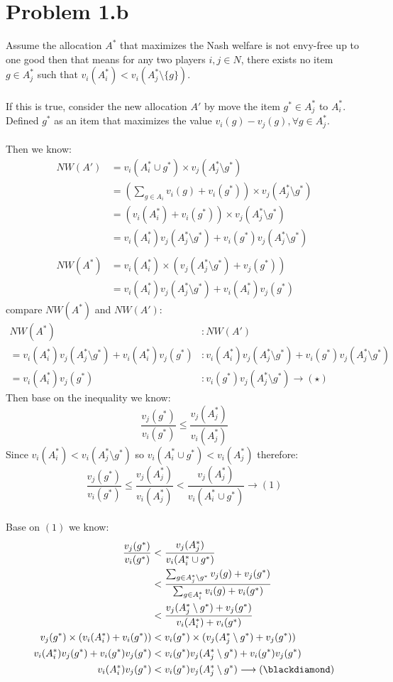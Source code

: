 \documentclass{article}
\begin{document}
\newpage
\section{Problem 1.b}

Assume the allocation $A^*$ that maximizes the Nash welfare is not envy-free up to one good then that means for any two players $i,j \in N$, there exists no item $g \in A^*_j$ such that $v_i(A^*_i) < v_i(A^*_j \setminus \{g\})$.\\\\
If this is true, consider the  new allocation $A'$ by move the item $g^* \in A^*_j$ to $A^*_i$. Defined $g^*$ as an item that maximizes the value $v_i(g) - v_j(g), \forall g \in A^*_j$.\\\\
Then we know:
\begin{align*}
NW(A') &= v_i(A^*_i \cup g^*) \times v_j(A^*_j \setminus g^*)\\
&= \left(\sum_{g \in A_i} v_i(g) + v_i(g^*)\right) \times v_j(A^*_j \setminus g^*)\\
&= (v_i(A^*_i) + v_i(g^*)) \times v_j(A^*_j \setminus g^*)\\
&= v_i(A^*_i)v_j(A^*_j \setminus g^*) + v_i(g^*)v_j(A^*_j \setminus g^*)\\\\
NW(A^*) &= v_i(A^*_i) \times (v_j(A^*_j \setminus g^*) + v_j(g^*))\\
&= v_i(A^*_i)v_j(A^*_j \setminus g^*) + v_i(A^*_i)v_j(g^*)
\end{align*}
compare $NW(A^*)$ and $NW(A')$:
\begin{align*}
NW(A^*) &: NW(A')\\
= v_i(A^*_i)v_j(A^*_j \setminus g^*) + v_i(A^*_i)v_j(g^*) &: v_i(A^*_i)v_j(A^*_j \setminus g^*) + v_i(g^*)v_j(A^*_j \setminus g^*)\\
= v_i(A^*_i)v_j(g^*) &: v_i(g^*)v_j(A^*_j \setminus g^*) \longrightarrow (\star)
\end{align*}
Then base on the inequality we know:
$$\frac{v_j(g^*)}{v_i(g^*)} \leq \frac{v_j(A^*_j)}{v_i(A^*_j)}$$
Since $v_i(A^*_i) < v_i(A^*_j \setminus g^*)$ so $v_i(A^*_i \cup g^*) < v_i(A^*_j)$ therefore:
$$\frac{v_j(g^*)}{v_i(g^*)} \leq \frac{v_j(A^*_j)}{v_i(A^*_j)} < \frac{v_j(A^*_j)}{v_i(A^*_i \cup g^*)} \longrightarrow (1)$$\\
Base on $(1)$ we know:
\begin{align*}
\frac{v_j(g^*)}{v_i(g^*)} &< \frac{v_j(A^*_j)}{v_i(A^*_i \cup g^*)}\\
&< \frac{\sum_{g \in A^*_j\setminus g^*}v_j(g) + v_j(g^*)}{\sum_{g \in A^*_i}v_i(g) + v_i(g^*)}\\
&< \frac{v_j(A^*_j \setminus g^*) + v_j(g^*)}{v_i(A^*_i) + v_i(g^*)}\\
v_j(g^*) \times (v_i(A^*_i) + v_i(g^*))&< v_i(g^*) \times (v_j(A^*_j \setminus g^*) + v_j(g^*))\\
v_i(A^*_i)v_j(g^*) + v_i(g^*)v_j(g^*) &< v_i(g^*)v_j(A^*_j \setminus g^*) + v_i(g^*)v_j(g^*)\\
v_i(A^*_i)v_j(g^*) &< v_i(g^*)v_j(A^*_j \setminus g^*) \longrightarrow (\blackdiamond)
\end{align*}
\end{document}
